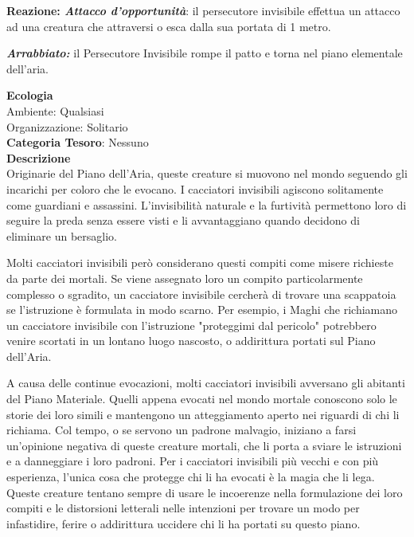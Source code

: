 \begin{multicols}{2}
{\textbf{Reazione: \emph{Attacco d'opportunità}}: il persecutore invisibile effettua un attacco ad una creatura che attraversi o esca dalla sua portata di 1 metro.

\emph{\textbf{Arrabbiato:}} il Persecutore Invisibile rompe il patto e torna nel piano elementale dell'aria.

\textbf{Ecologia}\\
Ambiente: Qualsiasi\\
Organizzazione: Solitario\\
\textbf{Categoria Tesoro}: Nessuno\\
\textbf{Descrizione}\\
Originarie del Piano dell'Aria, queste creature si muovono nel mondo seguendo gli incarichi per coloro che le evocano. I cacciatori invisibili agiscono solitamente come guardiani e assassini. L'invisibilità naturale e la furtività permettono loro di seguire la preda senza essere visti e li avvantaggiano quando decidono di eliminare un bersaglio.

Molti cacciatori invisibili però considerano questi compiti come misere richieste da parte dei mortali. Se viene assegnato loro un compito particolarmente complesso o sgradito, un cacciatore invisibile cercherà di trovare una scappatoia se l'istruzione è formulata in modo scarno. Per esempio, i Maghi che richiamano un cacciatore invisibile con l'istruzione "proteggimi dal pericolo" potrebbero venire scortati in un lontano luogo nascosto, o addirittura portati sul Piano dell'Aria.

A causa delle continue evocazioni, molti cacciatori invisibili avversano gli abitanti del Piano Materiale. Quelli appena evocati nel mondo mortale conoscono solo le storie dei loro simili e mantengono un atteggiamento aperto nei riguardi di chi li richiama. Col tempo, o se servono un padrone malvagio, iniziano a farsi un'opinione negativa di queste creature mortali, che li porta a sviare le istruzioni e a danneggiare i loro padroni. Per i cacciatori invisibili più vecchi e con più esperienza, l'unica cosa che protegge chi li ha evocati è la magia che li lega. Queste creature tentano sempre di usare le incoerenze nella formulazione dei loro compiti e le distorsioni letterali nelle intenzioni per trovare un modo per infastidire, ferire o addirittura uccidere chi li ha portati su questo piano.

}
\end{multicols}
